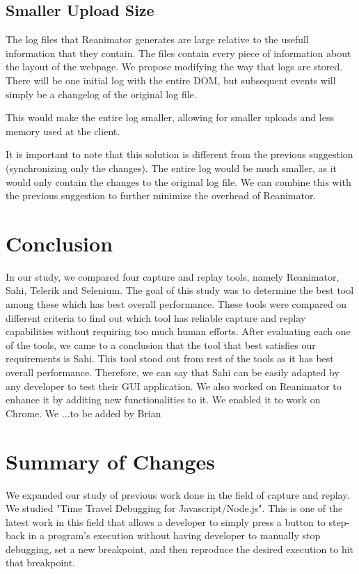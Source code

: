 \documentclass[12pt,journal]{IEEEtran}
\begin{document}
\subsection{Smaller Upload Size}
The log files that Reanimator generates are large relative to the usefull information that they contain. The files contain every piece of information about the layout of the webpage. We propose modifying the way that logs are stored. There will be one initial log with the entire DOM, but subsequent events will simply be a changelog of the original log file.
\par
This would make the entire log smaller, allowing for smaller uploads and less memory used at the client.
\par
It is important to note that this solution is different from the previous suggestion (synchronizing only the changes). The entire log would be much smaller, as it would only contain the changes to the original log file. We can combine this with the previous suggestion to further minimize the overhead of Reanimator.

\section{Conclusion}
In our study, we compared four capture and replay tools, namely Reanimator, Sahi, Telerik and Selenium. The goal of this study was to determine the best tool among these which has best overall performance. These tools were compared on different criteria to find out which tool has reliable capture and replay capabilities without requiring too much human efforts. After evaluating each one of the tools, we came to a conclusion that the tool that best satisfies our requirements is Sahi. This tool stood out from rest of the tools as it has best overall performance. Therefore, we can say that Sahi can be easily adapted by any developer to test their GUI application. We also worked on Reanimator to enhance it by additing new functionalities to it. We enabled it to work on Chrome. We ...{to be added by Brian}

\section{Summary of Changes}
We expanded our study of previous work done in the field of capture and replay. We studied "Time Travel Debugging for Javascript/Node.js". This is one of the latest work in this field that allows a developer to simply press a button to step-back in a program’s execution without having developer to manually stop debugging, set a new breakpoint, and then reproduce the desired execution to hit that breakpoint.




\printbibliography
\end{document}
